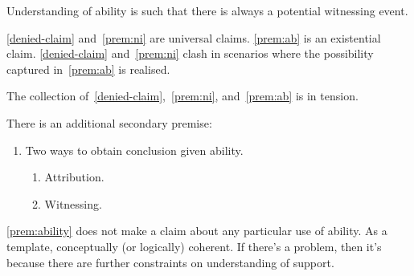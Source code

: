 Understanding of ability is such that there is always a potential witnessing event.

\ref{denied-claim} and~\ref{prem:ni} are universal claims.
\ref{prem:ab} is an existential claim.
\ref{denied-claim} and~\ref{prem:ni} clash in scenarios where the possibility captured in~\ref{prem:ab} is realised.

The collection of~\ref{denied-claim},~\ref{prem:ni}, and~\ref{prem:ab} is in tension.

There is an additional secondary premise:

\begin{note}
\begin{enumerate}
\item\label{prem:ability} Two ways to obtain conclusion given ability.
  \begin{enumerate}
  \item Attribution.
  \item Witnessing.
  \end{enumerate}
\end{enumerate}

\ref{prem:ability} does not make a claim about any particular use of ability.
As a template, conceptually (or logically) coherent.
If there's a problem, then it's because there are further constraints on understanding of support.
\end{note}